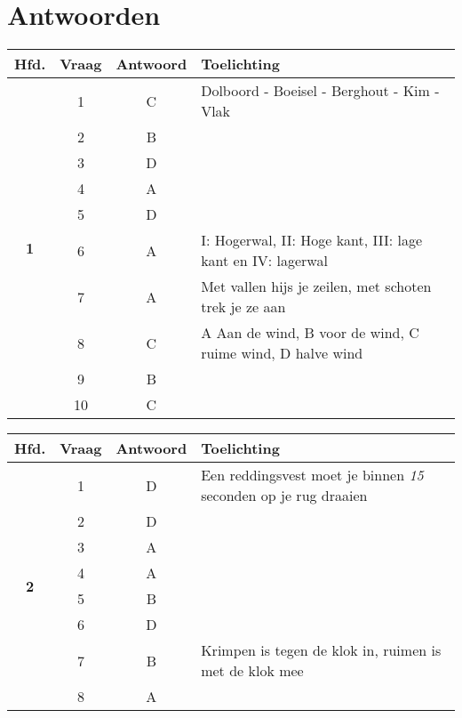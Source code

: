 \chapter{Antwoorden}
\vspace{-120px}
\begin{table}[h]
	\centering
	\begin{tabular}{c|c|c|m{9.5cm}}
	\textbf{Hfd.}       & \textbf{Vraag} & \textbf{Antwoord} & \textbf{Toelichting}                                             \\ \hline
	\multirow{10}{*}{\sffamily\bfseries{\textcolor{ocre}{\LARGE1}} } & 1  & C & Dolboord - Boeisel - Berghout - Kim - Vlak \\ \cline{2-4}          
	& 2 & B &  \\ \cline{2-4} 
	& 3 & D &  \\ \cline{2-4} 
	& 4 & A &  \\ \cline{2-4} 
	& 5 & D &  \\ \cline{2-4} 
	& 6 & A & I: Hogerwal, II: Hoge kant, III: lage kant en IV: lagerwal \\ \cline{2-4} 
	& 7 & A & Met vallen hijs je zeilen, met schoten trek je ze aan \\ \cline{2-4} 
	& 8 & C & A Aan de wind, B voor de wind, C ruime wind, D halve wind \\ \cline{2-4} 
	& 9 & B &  \\ \cline{2-4} 
	& 10 & C &  \\ 
	\end{tabular}
\end{table}


\begin{table}[h]
	\centering
	\begin{tabular}{c|c|c|m{9.5cm}}
		\textbf{Hfd.}       & \textbf{Vraag} & \textbf{Antwoord} & \textbf{Toelichting} \\ \hline 
		\multirow{8}{*}{\sffamily\bfseries{\textcolor{ocre}{\LARGE2}} } & 1   & D         & Een reddingsvest moet je binnen \textit{15} seconden op je rug draaien  \\ \cline{2-4} 
		& 2 & D &  \\ \cline{2-4} 
		& 3 & A &  \\ \cline{2-4} 
		& 4 & A &  \\ \cline{2-4} 
		& 5 & B &  \\ \cline{2-4} 
		& 6 & D &  \\ \cline{2-4} 
		& 7 & B & Krimpen is tegen de klok in, ruimen is met de klok mee  \\ \cline{2-4} 
		& 8 & A &  \\ 
	\end{tabular}
\end{table}

